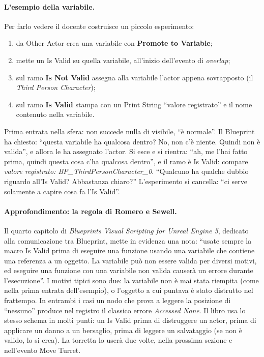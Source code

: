 \paragraph{L'esempio della variabile.} Per farlo vedere il docente costruisce un piccolo
esperimento:
\begin{enumerate}
  \item da Other Actor crea una variabile con \textbf{Promote to Variable};
  \item mette un Is Valid su quella variabile, all'inizio dell'evento di \emph{overlap};
  \item sul ramo \textbf{Is Not Valid} assegna alla variabile l'actor appena
        sovrapposto (il \emph{Third Person Character});
  \item sul ramo \textbf{Is Valid} stampa con un Print String ``valore registrato'' e il
        nome contenuto nella variabile.
\end{enumerate}
Prima entrata nella sfera: non succede nulla di visibile, ``è normale''. Il Blueprint ha
chiesto: ``questa variabile ha qualcosa dentro? No, non c'è niente. Quindi non è
valida'', e allora le ha assegnato l'actor. Si esce e si rientra: ``ah, me l'hai fatto
prima, quindi questa cosa c'ha qualcosa dentro'', e il ramo è Is Valid: compare
\emph{valore registrato: BP\_ThirdPersonCharacter\_0}. ``Qualcuno ha qualche dubbio
riguardo all'Is Valid? Abbastanza chiaro?'' L'esperimento si cancella: ``ci serve
solamente a capire cosa fa l'Is Valid''.

\paragraph{Approfondimento: la regola di Romero e Sewell.} Il quarto capitolo di
\emph{Blueprints Visual Scripting for Unreal Engine 5}, dedicato alla comunicazione tra
Blueprint, mette in evidenza una nota: ``usate sempre la macro Is Valid prima di
eseguire una funzione usando una variabile che contiene una referenza a un oggetto. La
variabile può non essere valida per diversi motivi, ed eseguire una funzione con una
variabile non valida causerà un errore durante l'esecuzione''. I motivi tipici sono
due: la variabile non è mai stata riempita (come nella prima entrata dell'esempio), o
l'oggetto a cui puntava è stato distrutto nel frattempo. In entrambi i casi un nodo che
prova a leggere la posizione di ``nessuno'' produce nel registro il classico errore
\emph{Accessed None}. Il libro usa lo stesso schema in molti punti: un Is Valid prima di
distruggere un actor, prima di applicare un danno a un bersaglio, prima di leggere un
salvataggio (se non è valido, lo si crea). La torretta lo userà due volte, nella
prossima sezione e nell'evento Move Turret.

